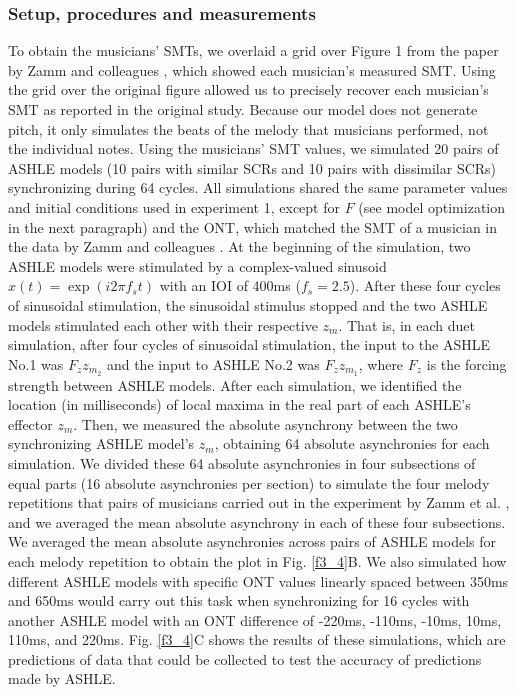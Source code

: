 \documentclass{report}
\begin{document}
\subsubsection{Setup, procedures and measurements}

To obtain the musicians' SMTs, we overlaid a grid over Figure 1 from the paper by Zamm and colleagues \cite{zamm2016endogenous}, which showed each musician's measured SMT. Using the grid over the original figure allowed us to precisely recover each musician's SMT as reported in the original study. Because our model does not generate pitch, it only simulates the beats of the melody that musicians performed, not the individual notes. Using the musicians' SMT values, we simulated 20 pairs of ASHLE models (10 pairs with similar SCRs and 10 pairs with dissimilar SCRs) synchronizing during 64 cycles. All simulations shared the same parameter values and initial conditions used in experiment 1, except for $F$ (see model optimization in the next paragraph) and the ONT, which matched the SMT of a musician in the data by Zamm and colleagues \cite{zamm2016endogenous}. At the beginning of the simulation, two ASHLE models were stimulated by a complex-valued sinusoid $x(t)=\exp(i2\pi	f_s t)$ with an IOI of 400ms ($f_s = 2.5$). After these four cycles of sinusoidal stimulation, the sinusoidal stimulus stopped and the two ASHLE models stimulated each other with their respective $z_m$. That is, in each duet simulation, after four cycles of sinusoidal stimulation, the input to the ASHLE No.1 was $F_z z_{m_2}$ and the input to ASHLE No.2 was $F_z z_{m_1}$, where $F_z$ is the forcing strength between ASHLE models. After each simulation, we identified the location (in milliseconds) of local maxima in the real part of each ASHLE's effector $z_m$. Then, we measured the absolute asynchrony between the two synchronizing ASHLE model's $z_m$, obtaining 64 absolute asynchronies for each simulation. We divided these 64 absolute asynchronies in four subsections of equal parts (16 absolute asynchronies per section) to simulate the four melody repetitions that pairs of musicians carried out in the experiment by Zamm et al. \cite{zamm2016endogenous}, and we averaged the mean absolute asynchrony in each of these four subsections. We averaged the mean absolute asynchronies across pairs of ASHLE models for each melody repetition to obtain the plot in Fig.{} \ref{f3_4}B. We also simulated how different ASHLE models with specific ONT values linearly spaced between 350ms and 650ms would carry out this task when synchronizing for 16 cycles with another ASHLE model with an ONT difference of -220ms, -110ms, -10ms, 10ms, 110ms, and 220ms. Fig.{} \ref{f3_4}C shows the results of these simulations, which are predictions of data that could be collected to test the accuracy of predictions made by ASHLE.
\end{document}
